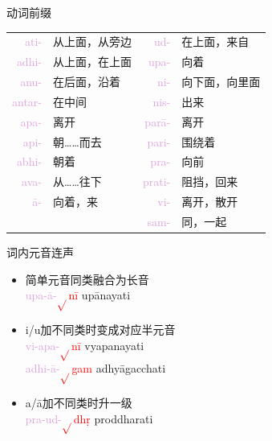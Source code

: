 \documentclass[17pt]{beamer}
\newcommand{\verbroot}[1]{\textcolor{red}{$\sqrt{}$#1}}
\newcommand{\fullpada}[1]{\textcolor{OliveGreen}{#1}}
\newcommand{\pratyaya}[1]{\textcolor{Plum}{#1}}
\begin{document}
\begin{frame}{动词前缀}
  \small
  \centering
    \begin{tabular}{@{}rlrl@{}} %
      \pratyaya{ati\nobreakdash-} & 从上面，从旁边 & \pratyaya{ud\nobreakdash-} & 在上面，来自  \\
      \pratyaya{adhi\nobreakdash-} & 从上面，在上面  & \pratyaya{upa\nobreakdash-} & 向着   \\
      \pratyaya{anu\nobreakdash-} & 在后面，沿着 & \pratyaya{ni\nobreakdash-} & 向下面，向里面 \\
      \pratyaya{antar\nobreakdash-} & 在中间 & \pratyaya{nis\nobreakdash-} & 出来 \\
      \pratyaya{apa\nobreakdash-} & 离开 & \pratyaya{parā\nobreakdash-} & 离开 \\
      \pratyaya{api\nobreakdash-} & 朝……而去 & \pratyaya{pari\nobreakdash-} & 围绕着 \\
      \pratyaya{abhi\nobreakdash-} & 朝着 & \pratyaya{pra\nobreakdash-} & 向前 \\
      \pratyaya{ava\nobreakdash-} & 从……往下 & \pratyaya{prati\nobreakdash-} & 阻挡，回来 \\
      \pratyaya{ā\nobreakdash-} & 向着，来 & \pratyaya{vi\nobreakdash-} & 离开，散开 \\
       &  & \pratyaya{sam\nobreakdash-} & 同，一起 \\
    \end{tabular}
\end{frame}

\begin{frame}{词内元音连声}
  \begin{itemize}
    \item 简单元音同类融合为长音\\
    \pratyaya{upa\nobreakdash-ā\nobreakdash-}\verbroot{nī} \fullpada{upānayati}  \\
    \item i/u加不同类时变成对应半元音\\
    \pratyaya{vi\nobreakdash-apa\nobreakdash-}\verbroot{nī} \fullpada{vyapanayati}  \\
    \pratyaya{adhi\nobreakdash-ā\nobreakdash-}\verbroot{gam} \fullpada{adhyāgacchati}  \\
    \item a/ā加不同类时升一级\\ 
    \pratyaya{pra\nobreakdash-ud\nobreakdash-}\verbroot{dhṛ} \fullpada{proddharati}  \\
  \end{itemize}
\end{frame}
\end{document}
